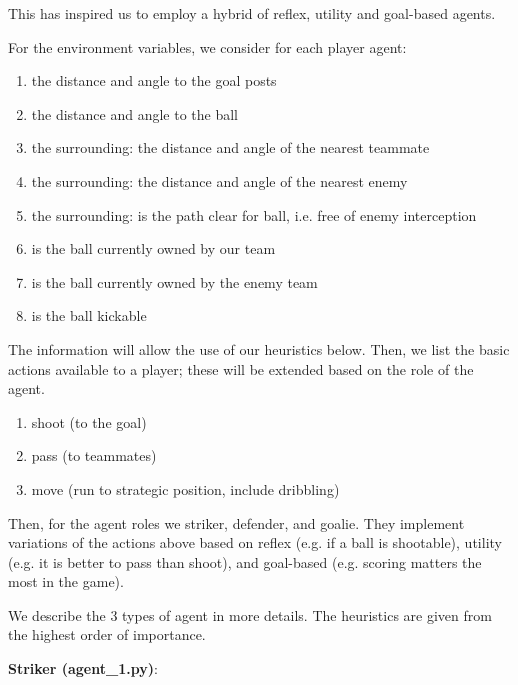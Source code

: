 \documentclass[12pt]{article}  %
\begin{document}
This has inspired us to employ a hybrid of reflex, utility and goal-based agents. 

For the environment variables, we consider for each player agent:

\begin{enumerate}
	\item the distance and angle to the goal posts
	\item the distance and angle to the ball
	\item the surrounding: the distance and angle of the nearest teammate
	\item the surrounding: the distance and angle of the nearest enemy
	\item the surrounding: is the path clear for ball, i.e. free of enemy interception
	\item is the ball currently owned by our team
	\item is the ball currently owned by the enemy team
	\item is the ball kickable
\end{enumerate}


The information will allow the use of our heuristics below. Then, we list the basic actions available to a player; these will be extended based on the role of the agent.

\begin{enumerate}
	\item shoot (to the goal)
	\item pass (to teammates)
	\item move (run to strategic position, include dribbling)
\end{enumerate}


Then, for the agent roles we striker, defender, and goalie. They implement variations of the actions above based on reflex (e.g. if a ball is shootable), utility (e.g. it is better to pass than shoot), and goal-based (e.g. scoring matters the most in the game). 

We describe the 3 types of agent in more details. The heuristics are given from the highest order of importance.

{\bf Striker (agent\_1.py)}:
\end{document}
